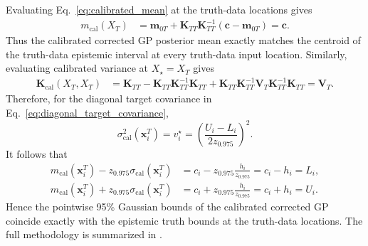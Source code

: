 \documentclass[a4paper,12pt]{article}
\newcommand{\x}{\mathbf{x}}
\begin{document}
Evaluating Eq.~\eqref{eq:calibrated_mean} at the truth-data locations gives
\begin{align*}
    m_{\mathrm{cal}}(X_T)
    &=
    \mathbf{m}_{0T}
    +
    \mathbf{K}_{TT}
    \mathbf{K}_{TT}^{-1}
    \left(
    \mathbf{c}
    -
    \mathbf{m}_{0T}
    \right)
    \nonumber = \mathbf{c}.
\end{align*}
Thus the calibrated corrected GP posterior mean exactly matches the centroid of
the truth-data epistemic interval at every truth-data input location.
Similarly, evaluating calibrated variance at
$X_\star=X_T$ gives
\begin{align*}
    \mathbf{K}_{\mathrm{cal}}(X_T,X_T)
    &=
    \mathbf{K}_{TT}
    -
    \mathbf{K}_{TT}
    \mathbf{K}_{TT}^{-1}
    \mathbf{K}_{TT}
    +
    \mathbf{K}_{TT}
    \mathbf{K}_{TT}^{-1}
    \mathbf{V}_T
    \mathbf{K}_{TT}^{-1}
    \mathbf{K}_{TT}
    \nonumber = \mathbf{V}_T.
\end{align*}
Therefore, for the diagonal target covariance in
Eq.~\eqref{eq:diagonal_target_covariance},
\begin{equation*}
    \sigma_{\mathrm{cal}}^2(\x_i^T)
    =
    v_i^\star
    =
    \left(
    \frac{U_i-L_i}{2z_{0.975}}
    \right)^2.
\end{equation*}
It follows that
\begin{align*}
    m_{\mathrm{cal}}(\x_i^T)
    -
    z_{0.975}
    \sigma_{\mathrm{cal}}(\x_i^T)
    &=
    c_i
    -
    z_{0.975}
    \frac{h_i}{z_{0.975}}
    =
    c_i-h_i
    =
    L_i,
    \\
    m_{\mathrm{cal}}(\x_i^T)
    +
    z_{0.975}
    \sigma_{\mathrm{cal}}(\x_i^T)
    &=
    c_i
    +
    z_{0.975}
    \frac{h_i}{z_{0.975}}
    =
    c_i+h_i
    =
    U_i.
\end{align*}
Hence the pointwise 95\% Gaussian bounds of the calibrated corrected GP coincide
exactly with the epistemic truth bounds at the truth-data locations. The full methodology is summarized in .
\end{document}
